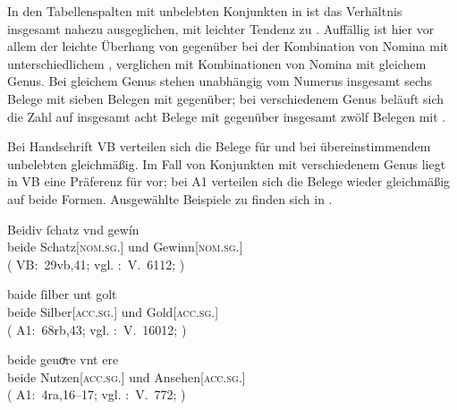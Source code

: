 In den Tabellenspalten mit unbelebten Konjunkten in
 ist das Verhältnis insgesamt nahezu ausgeglichen,
mit leichter Tendenz zu . Auffällig ist hier vor allem der leichte
Überhang von  gegenüber  bei der Kombination von
Nomina mit unterschiedlichem , verglichen mit Kombinationen von
Nomina mit gleichem Genus. Bei gleichem Genus stehen unabhängig vom Numerus
insgesamt sechs Belege mit  sieben Belegen mit
 gegenüber; bei verschiedenem Genus beläuft sich die Zahl auf
insgesamt acht Belege mit  gegenüber insgesamt zwölf Belegen mit
.

Bei Handschrift VB verteilen sich die Belege für  und
 bei übereinstimmendem unbelebten 
gleichmäßig. Im Fall von Konjunkten mit verschiedenem Genus liegt in VB
eine Präferenz für  vor; bei A1 verteilen sich die Belege wieder
gleichmäßig auf beide Formen. Ausgewählte Beispiele zu 
finden sich in .

\begin{exe}
\ex \label{ex:konjbeidirreginan}
	\begin{xlist}
	\ex \gll Beidiv ſchatz vnd gewín \\
			beide Schatz[\textsc{nom.sg.\MascI}] und Gewinn[\textsc{nom.sg.\MascI}] \\
		\trans {}
			(%
				VB:~29vb,41; vgl.
				\KC:~V.~6112;
				\cite[194]{schroeder1895}%
			)
		\label{ex:konjbeidirreginan_1}

	\ex \gll baide ſilber unt golt \\
			beide Silber[\textsc{acc.sg.\NeutI}] und Gold[\textsc{acc.sg.\NeutI}] \\
		\trans {}
			(%
				A1:~68rb,43; vgl.
				\KC:~V.~16012;
				\cite[370]{schroeder1895}%
			)
		\label{ex:konjbeidirreginan_2}

	\ex \gll beide geuoͮre vnt ere \\
			beide Nutzen[\textsc{acc.sg.\NeutI}] und Ansehen[\textsc{acc.sg.\FemI}] \\
		\trans {}
			(%
				A1:~4ra,16--17; vgl.
				\KC:~V.~772;
				\cite[95]{schroeder1895}%
			)
		\label{ex:konjbeidirreginan_3}
	\end{xlist}
\end{exe}


